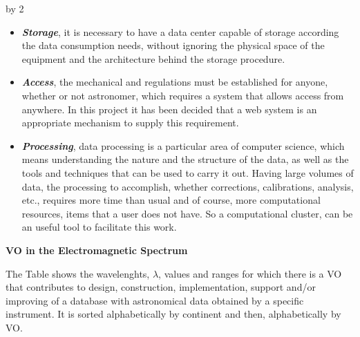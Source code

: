 \documentclass[11pt]{scrartcl}
\def\anzspalten{2}
\newlength{\kastenwidth}
\newenvironment{kasten}{
  \begin{lrbox}{\dummybox}
    \begin{minipage}{\linewidth}}
    {\end{minipage}
  \end{lrbox}
  \raisebox{-\depth}{\psshadowbox[cornersize=absolute,linearc=14pt,framesep=1em]{\usebox{\dummybox}}}\\[0.5em]}
\newenvironment{spalte}{
  \setlength\kastenwidth{1.2\textwidth}
  \divide\kastenwidth by \anzspalten
  \begin{minipage}[t]{\kastenwidth}}{\end{minipage}}
\begin{document}
\begin{lrbox}{\spalten}
{\begin{spalte}
\begin{kasten}
		\begin{itemize}
		    \item \emph{\textbf{Storage}}, it is necessary to have a data center
		        capable of storage according the data consumption needs,
		        without ignoring the physical space of the equipment and
		        the architecture behind the storage procedure.
		    \item \emph{\textbf{Access}}, the mechanical and regulations must be
		        established for anyone, whether or not astronomer, which
		        requires a system that allows access from anywhere.
		        In this project it has been decided that a web system is an
		        appropriate mechanism to supply this requirement.
		    \item \emph{\textbf{Processing}}, data processing is a particular area
		        of computer science, which means understanding the nature and the
		        structure of the data, as well as the tools and techniques
		        that can be used to carry it out. Having large volumes of data,
		        the processing to accomplish, whether corrections, calibrations,
		        analysis, etc., requires more time than usual and of course,
		        more computational resources, items that a user does not have.
		        So a computational cluster, can be an useful tool to facilitate
		        this work.
		\end{itemize}
		\textbf{VO in the Electromagnetic Spectrum}

		The Table shows the wavelenghts, $ \lambda $, values and
		ranges for which there is a VO that contributes to design,
		construction, implementation, support and/or improving of a database with
		astronomical data obtained by a specific instrument. It is sorted alphabetically
		by continent and then, alphabetically by VO.
		

\end{kasten}
\end{spalte}}
\end{lrbox}
\end{document}
